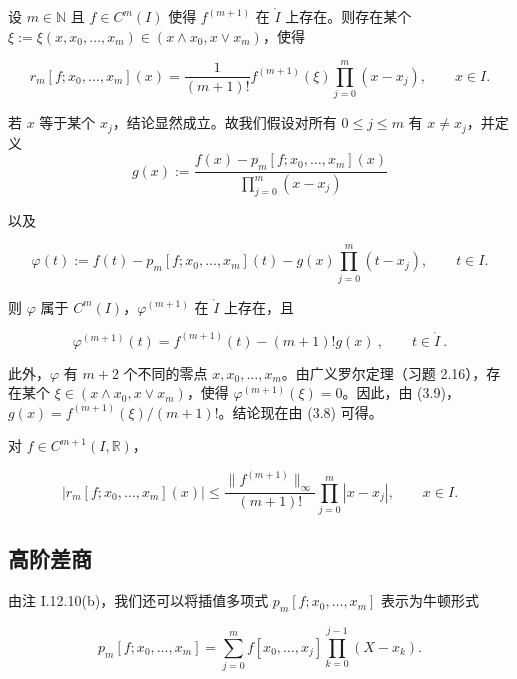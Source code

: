 \begin{proposition}

设 $ m \in \mathbb{N} $ 且 $ f \in C^m(I) $ 使得 $ f^{(m+1)} $ 在 $ \mathring{I} $ 上存在。则存在某个 $ \xi := \xi(x, x_0, \ldots, x_m) \in (x \land x_0, x \lor x_m) $，使得

\[
r_{m}[f;x_{0},\ldots,x_{m}](x)=\frac{1}{(m+1)!}f^{(m+1)}(\xi)\prod_{j=0}^{m}(x-x_{j}),\qquad x\in I.
\]

\proofhead
若 $x$ 等于某个 $x_j$，结论显然成立。故我们假设对所有 $0 \leq j \leq m$ 有 $x \neq x_j$，并定义
\[
g(x):=\frac{f(x)-p_{m}[f;x_{0},\ldots,x_{m}](x)}{\prod_{j=0}^{m}(x-x_{j})}
\]

以及

\[
\varphi(t):=f(t)-p_{m}[f;x_{0},\ldots,x_{m}](t)-g(x)\prod_{j=0}^{m}(t-x_{j}),\qquad t\in I.
\]

则 $ \varphi $ 属于 $ C^{m}(I) $，$ \varphi^{(m+1)} $ 在 $ \mathring{I} $ 上存在，且

\begin{equation}
\varphi^{(m+1)}(t)=f^{(m+1)}(t)-(m+1)!g(x)~,\qquad t\in\mathring{I}~.
\end{equation}

此外，$\varphi$ 有 $m+2$ 个不同的零点 $x,x_0,\ldots,x_m$。由广义罗尔定理（习题 2.16），存在某个 $\xi\in(x\land x_0,x\lor x_m)$，使得 $\varphi^{(m+1)}(\xi)=0$。因此，由 (3.9)，$g(x)=f^{(m+1)}(\xi)/(m+1)!$。结论现在由 (3.8) 可得。

\end{proposition}

\begin{corollary}

对 $ f \in C^{m+1}(I, \mathbb{R}) $，

\begin{equation}
\left|r_{m}[f;x_{0},\ldots,x_{m}](x)\right|\leq\frac{\|f^{(m+1)}\|_{\infty}}{(m+1)!}\prod_{j=0}^{m}\left|x-x_{j}\right|,\qquad x\in I.
\end{equation}
\end{corollary}

\subsection*{高阶差商}

由注 I.12.10(b)，我们还可以将插值多项式 $ p_m[f; x_0, \ldots, x_m] $ 表示为牛顿形式

\begin{equation}
p_{m}[f;x_{0},\ldots,x_{m}]=\sum_{j=0}^{m}f[x_{0},\ldots,x_{j}]\prod_{k=0}^{j-1}(X-x_{k}).
\end{equation}

